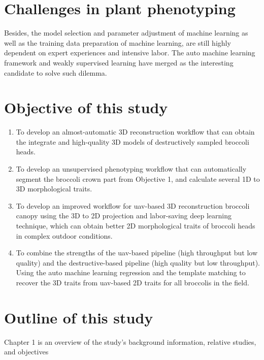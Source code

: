 \section{Challenges in plant phenotyping}


Besides, the model selection and parameter adjustment of machine learning as well as the training data preparation of machine learning, are still highly dependent on expert experiences and intensive labor. The auto machine learning framework and weakly supervised learning have merged as the interesting candidate to solve such dilemma.

\section{Objective of this study}

\begin{enumerate}
    \item To develop an almost-automatic 3D reconstruction workflow that can obtain the integrate and high-quality 3D models of destructively sampled broccoli heads.
    \item To develop an unsupervised phenotyping workflow that can automatically segment the broccoli crown part from Objective 1, and calculate several 1D to 3D morphological traits.
    \item To develop an improved workflow for \gls{uav}-based 3D reconstruction broccoli canopy using the 3D to 2D projection and labor-saving deep learning technique, which can obtain better 2D morphological traits of broccoli heads in complex outdoor conditions.
    \item To combine the strengths of the \gls{uav}-based pipeline (high throughput but low quality) and the destructive-based pipeline (high quality but low throughput). Using the auto machine learning regression and the template matching to recover the 3D traits from \gls{uav}-based 2D traits for all broccolis in the field.

\end{enumerate}


\section{Outline of this study}

Chapter 1 is an overview of the study's background information, relative studies, and objectives

